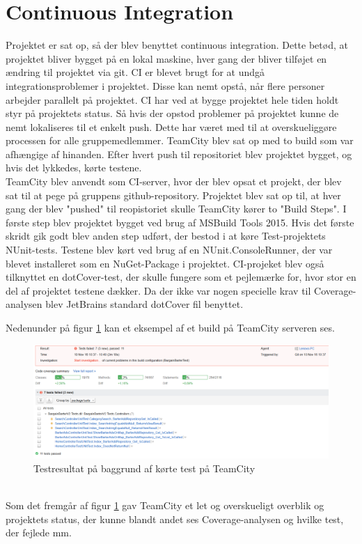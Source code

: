 \section{Continuous Integration}
Projektet er sat op, så der blev benyttet continuous integration. Dette betød, at projektet bliver bygget på en lokal maskine, hver gang der bliver tilføjet en ændring til projektet via git. CI er blevet brugt for at undgå integrationsproblemer i projektet. Disse kan nemt opstå, når flere personer arbejder parallelt på projektet. CI har ved at bygge projektet hele tiden holdt styr på projektets status. Så hvis der opstod problemer på projektet kunne de nemt lokaliseres til et enkelt push. Dette har været med til at overskueliggøre processen for alle gruppemedlemmer.
TeamCity blev sat op med to build som var afhængige af hinanden. Efter hvert push til repositoriet blev projektet bygget, og hvis det lykkedes, kørte testene. 
\\
\noindent TeamCity blev anvendt som CI-server, hvor der blev opsat et  projekt, der blev sat til at pege på gruppens github-repository. Projektet blev sat op til, at hver gang der blev "pushed" til reopistoriet skulle TeamCity kører to "Build Steps". I første step blev projektet bygget ved brug af MSBuild Tools 2015. Hvis det første skridt gik godt blev anden step udført, der bestod i at køre Test-projektets NUnit-tests. Testene blev kørt ved brug af en NUnit.ConsoleRunner, der var blevet installeret som en NuGet-Package i projektet.  
CI-projeket blev også tilknyttet en dotCover-test, der skulle fungere som et pejlemærke for, hvor stor en del af projektet testene dækker. Da der ikke var nogen specielle krav til Coverage-analysen blev JetBrains standard dotCover fil benyttet.

\noindent Nedenunder på figur \ref{fig:TeamCityTest} kan et eksempel af et build på TeamCity serveren ses. 
\begin{figure}[ht!]
	\centering
	\includegraphics[width=120mm]{figures/TeamCityTest.png}
	\caption{Testresultat på baggrund af kørte test på TeamCity}
	\label{fig:TeamCityTest}
\end{figure}
\\
Som det fremgår af figur \ref{fig:TeamCityTest} gav TeamCity et let og overskueligt overblik og projektets status, der kunne blandt andet ses Coverage-analysen og hvilke test, der fejlede mm.
\\

